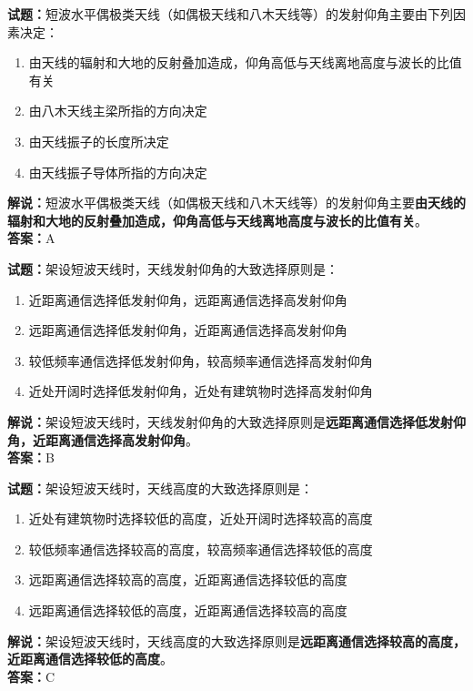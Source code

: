 \documentclass{ctexbook}
\begin{document}
\bigskip


\noindent\textbf{试题：}短波水平偶极类天线（如偶极天线和八木天线等）的发射仰角主要由下列因素决定：
\begin{enumerate}[leftmargin=3em]
\item 由天线的辐射和大地的反射叠加造成，仰角高低与天线离地高度与波长的比值有关
\item 由八木天线主梁所指的方向决定
\item 由天线振子的长度所决定
\item 由天线振子导体所指的方向决定
\end{enumerate}
\noindent\textbf{解说：}短波水平偶极类天线（如偶极天线和八木天线等）的发射仰角主要\textbf{由天线的辐射和大地的反射叠加造成，仰角高低与天线离地高度与波长的比值有关}。\\\noindent\textbf{答案：}A



\bigskip


\noindent\textbf{试题：}架设短波天线时，天线发射仰角的大致选择原则是：
\begin{enumerate}[leftmargin=3em]
\item 近距离通信选择低发射仰角，远距离通信选择高发射仰角
\item 远距离通信选择低发射仰角，近距离通信选择高发射仰角
\item 较低频率通信选择低发射仰角，较高频率通信选择高发射仰角
\item 近处开阔时选择低发射仰角，近处有建筑物时选择高发射仰角
\end{enumerate}
\noindent\textbf{解说：}架设短波天线时，天线发射仰角的大致选择原则是\textbf{远距离通信选择低发射仰角，近距离通信选择高发射仰角}。\\\noindent\textbf{答案：}B




\bigskip


\noindent\textbf{试题：}架设短波天线时，天线高度的大致选择原则是：
\begin{enumerate}[leftmargin=3em]
\item 近处有建筑物时选择较低的高度，近处开阔时选择较高的高度
\item 较低频率通信选择较高的高度，较高频率通信选择较低的高度
\item 远距离通信选择较高的高度，近距离通信选择较低的高度
\item 远距离通信选择较低的高度，近距离通信选择较高的高度
\end{enumerate}
\noindent\textbf{解说：}架设短波天线时，天线高度的大致选择原则是\textbf{远距离通信选择较高的高度，近距离通信选择较低的高度}。\\\noindent\textbf{答案：}C
\end{document}
